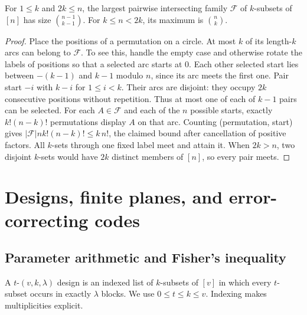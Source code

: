 \begin{theorem}\label{result41}
For \(1\le k\) and \(2k\le n\), the largest pairwise intersecting
family \(\mathcal F\) of \(k\)-subsets of \([n]\) has size
\(\binom{n-1}{k-1}\). For \(k\le n<2k\), its maximum is \(\binom nk\).
\end{theorem}
\begin{proof}
Place the positions of a permutation on a circle. At most \(k\) of its
length-\(k\) arcs can belong to \(\mathcal F\). To see this, handle
the empty case and otherwise rotate the labels of positions so that a
selected arc starts at \(0\). Each other selected start lies between
\(-(k-1)\) and \(k-1\) modulo \(n\), since its arc meets the first one.
Pair start \(-i\) with \(k-i\) for \(1\le i<k\). Their arcs are
disjoint: they occupy \(2k\) consecutive positions without repetition.
Thus at most one of each of \(k-1\) pairs can be selected.
For each \(A\in\mathcal F\) and each of the \(n\) possible starts,
exactly \(k!(n-k)!\) permutations display \(A\) on that arc. Counting
(permutation, start) gives
\(|\mathcal F|n k!(n-k)!\le k\,n!\), the claimed bound after
cancellation of positive factors. All \(k\)-sets through one fixed
label meet and attain it. When \(2k>n\), two disjoint \(k\)-sets
would have \(2k\) distinct members of \([n]\), so every pair meets.
\end{proof}

\section{Designs, finite planes, and error-correcting codes}
\label{sec:incidence-structure}

\subsection{Parameter arithmetic and Fisher's inequality}

A \(t\)-\((v,k,\lambda)\) design is an indexed list of \(k\)-subsets
of \([v]\) in which every \(t\)-subset occurs in exactly \(\lambda\)
blocks. We use \(0\le t\le k\le v\). Indexing makes multiplicities
explicit.


